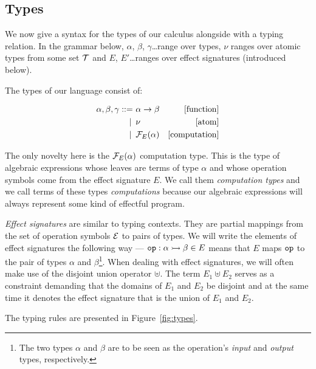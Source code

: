 \documentclass{llncs}
\begin{document}
\subsection{Types}
\label{ssec:types}

We now give a syntax for the types of our calculus alongside with a typing
relation. In the grammar below, $\alpha$, $\beta$, $\gamma$\ldots range
over types, $\nu$ ranges over atomic types from some set $\mathcal{T}$ and $E$,
$E'$\ldots ranges over effect signatures (introduced below).

The types of our language consist of:

\begin{align*}
  \alpha, \beta, \gamma ::= &\ \alpha \to \beta & \mbox{[function]} \\
   | \, &\ \nu & \mbox{[atom]} \\
   | \, &\ \mathcal{F}_E(\alpha) & \mbox{[computation]}
\end{align*}

The only novelty here is the $\mathcal{F}_E(\alpha)$ computation type. This is the
type of algebraic expressions whose leaves are terms of type $\alpha$ and
whose operation symbols come from the effect signature $E$. We call them
\emph{computation types} and we call terms of these types
\emph{computations} because our algebraic expressions will always represent
some kind of effectful program.

\emph{Effect signatures} are similar to typing contexts. They are partial
mappings from the set of operation symbols $\mathcal{E}$ to pairs of types. We will
write the elements of effect signatures the following way ---
$\mathtt{op} : \alpha \rightarrowtail \beta \in E$ means that $E$ maps $\mathtt{op}$ to the
pair of types $\alpha$ and $\beta$\footnote{The two types $\alpha$ and
  $\beta$ are to be seen as the operation's \emph{input} and \emph{output}
  types, respectively.}. When dealing with effect signatures, we will often
make use of the disjoint union operator $\uplus$. The term $E_1 \uplus E_2$
serves as a constraint demanding that the domains of $E_1$ and $E_2$ be
disjoint and at the same time it denotes the effect signature that is the
union of $E_1$ and $E_2$.

The typing rules are presented in Figure~\ref{fig:types}.

\newcommand{\handlerrule}{
 \begin{prooftree}
  \AxiomC{$E = \{\typedopg{\op{op}_i}{\alpha_i}{\beta_i}\}_{i \in I} \uplus E_{\mathrm{f}}$}
  \noLine
  \def\extraVskip{0pt}
  \UnaryInfC{$E' = E'' \uplus E_{\mathrm{f}}$}
  \noLine
  \UnaryInfC{$[\Gamma \vdash M_i : \alpha_i \to (\beta_i \to
    \FF_{E'}(\delta)) \to \FF_{E'}(\delta)]_{i \in I}$}
  \noLine
  \UnaryInfC{$\Gamma \vdash M_\eta : \gamma \to \FF_{E'}(\delta)$}
  \noLine
  \UnaryInfC{$\Gamma \vdash N : \FF_{E}(\gamma)$}
  \def\extraVskip{2pt}
  \RightLabel{[$\banana{}$]}
  \UnaryInfC{$\Gamma \vdash \ap{\cibanana}{N} : \FF_{E'}(\delta)$}
 \end{prooftree}}
\end{document}
